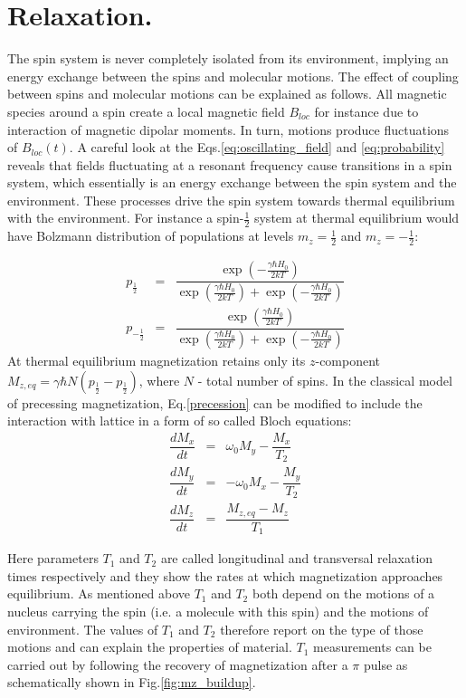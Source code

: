 \documentclass[a4paper, 12pt]{article}
\begin{document}
\section{Relaxation.}
 The spin system is never completely isolated from its environment, implying an energy exchange between the spins and molecular motions. The effect of coupling between spins and molecular motions can be explained as follows.
 All magnetic species around a spin create a local magnetic field $B_{loc}$ for instance due to interaction of magnetic dipolar moments. In turn, motions produce fluctuations of $B_{loc}(t)$. A careful look at the Eqs.\ref{eq:oscillating_field} and \ref{eq:probability} reveals that fields fluctuating at a resonant frequency cause transitions in a spin system, which essentially is an energy exchange between the spin system and the environment. These processes drive the spin system towards thermal equilibrium with the environment. For instance a spin-$\frac{1}{2}$ system at thermal equilibrium would have Bolzmann distribution of populations at levels $m_z=\frac{1}{2}$ and $m_z=-\frac{1}{2}$:

\begin{equation}
\begin{array} {lcl} \label{eq:populations}
p_{\frac{1}{2}} &=& \dfrac{\exp{ (-\frac{\gamma \hbar H_0}{2kT}) }}{\exp{ (\frac{\gamma \hbar H_0}{2kT}) }+\exp{ (-\frac{\gamma \hbar H_0}{2kT} )}} \\
p_{-\frac{1}{2}} &=& \dfrac{\exp{ (\frac{\gamma \hbar H_0}{2kT}) }}{\exp{ (\frac{\gamma \hbar H_0}{2kT}) }+\exp{ (-\frac{\gamma \hbar H_0}{2kT} )}}
\end{array}
\end{equation}
 At thermal equilibrium magnetization retains only its $z$-component $M_{z,eq} = \gamma \hbar N (p_{\frac{1}{2}} - p_{\frac{1}{2}}) $, where $N$ - total number of spins. In the classical model of precessing magnetization, Eq.\ref{precession} can be modified to include the interaction with lattice in a form of so called Bloch equations:
\begin{equation}
\begin{array}{lcl}
\dfrac{dM_x}{dt} & = & \omega_0 M_y - \dfrac{M_x}{T_2}  \\
\dfrac{dM_y}{dt} & = & -\omega_0 M_x - \dfrac{M_y}{T_2} \\
\dfrac{dM_z}{dt} & = & \dfrac{M_{z,eq}-M_z}{T_1} 
\end{array}
\end{equation} 

Here parameters $T_1$ and $T_2$ are called longitudinal and transversal relaxation times respectively and they show the rates at which magnetization approaches equilibrium. As mentioned above $T_1$ and $T_2$ both depend on the motions of a nucleus carrying the spin (i.e. a molecule with this spin) and the motions of environment. The values of $T_1$ and $T_2$ therefore report on the type of those motions and can explain the properties of material. 
$T_1$ measurements can be carried out by following the recovery of magnetization after a $\pi$ pulse as schematically shown in Fig.\ref{fig:mz_buildup}. 
\end{document}
